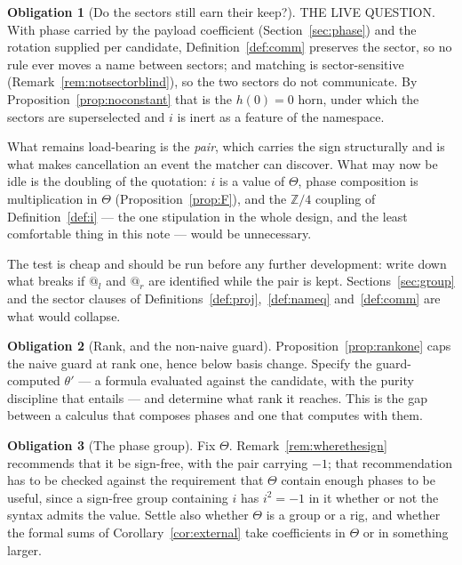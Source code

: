 \documentclass[11pt]{article}
\makeatletter
\theoremstyle{definition}
\newtheorem{obligation}{Obligation}
\theoremstyle{remark}
\newcommand{\quo}[1]{\ensuremath{@_{#1}}}
\makeatother
\begin{document}
\begin{obligation}[Do the sectors still earn their keep?]
\label{ob:sectors}
THE LIVE QUESTION. With phase carried by the payload coefficient
(Section~\ref{sec:phase}) and the rotation supplied per candidate,
Definition~\ref{def:comm} preserves the sector, so no rule ever moves a name
between sectors; and matching is sector-sensitive
(Remark~\ref{rem:notsectorblind}), so the two sectors do not communicate. By
Proposition~\ref{prop:noconstant} that is the $h(0)=0$ horn, under which the
sectors are superselected and $i$ is inert as a feature of the namespace.

What remains load-bearing is the \emph{pair}, which carries the sign
structurally and is what makes cancellation an event the matcher can discover.
What may now be idle is the doubling of the quotation: $i$ is a value of
$\Theta$, phase composition is multiplication in $\Theta$
(Proposition~\ref{prop:F}), and the $\mathbb{Z}/4$ coupling of
Definition~\ref{def:i} --- the one stipulation in the whole design, and the
least comfortable thing in this note --- would be unnecessary.

The test is cheap and should be run before any further development: write down
what breaks if $\quo{l}$ and $\quo{r}$ are identified while the pair is kept.
Sections~\ref{sec:group} and the sector clauses of
Definitions~\ref{def:proj},~\ref{def:nameq} and~\ref{def:comm} are what would
collapse.
\end{obligation}

\begin{obligation}[Rank, and the non-naive guard]
\label{ob:rank}
Proposition~\ref{prop:rankone} caps the naive guard at rank one, hence below
basis change. Specify the guard-computed $\theta'$ --- a formula evaluated
against the candidate, with the purity discipline that entails --- and determine
what rank it reaches. This is the gap between a calculus that composes phases
and one that computes with them.
\end{obligation}

\begin{obligation}[The phase group]
\label{ob:theta}
Fix $\Theta$. Remark~\ref{rem:wherethesign} recommends that it be sign-free,
with the pair carrying $-1$; that recommendation has to be checked against the
requirement that $\Theta$ contain enough phases to be useful, since a sign-free
group containing $i$ has $i^2 = -1$ in it whether or not the syntax admits the
value. Settle also whether $\Theta$ is a group or a rig, and whether the
formal sums of Corollary~\ref{cor:external} take coefficients in $\Theta$ or in
something larger.
\end{obligation}
\end{document}
